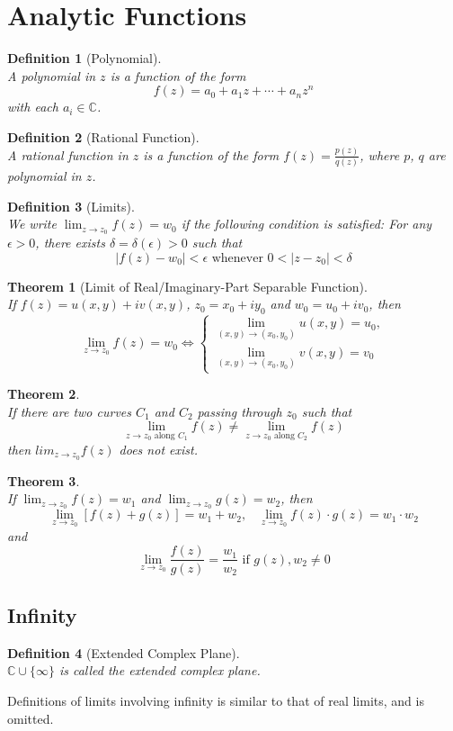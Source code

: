 \documentclass[12pt]{article}
\newtheorem{definition}{Definition}[section]
\newtheorem{theorem}{Theorem}[section]
\theoremstyle{definition}
\begin{document}
\section{Analytic Functions}
\begin{definition}[Polynomial]
\hfill\\\normalfont A polynomial in $z$ is a function of the form
\[
f(z)=a_0 + a_1z+ \cdots + a_nz^n
\]
with each $a_i \in \mathbb{C}$.
\end{definition}
\begin{definition}[Rational Function]
\hfill\\\normalfont A rational function in $z$ is a function of the form $f(z)=\frac{p(z)}{q(z)}$, where $p$, $q$ are polynomial in $z$.
\end{definition}
\begin{definition}[Limits]
\hfill\\\normalfont We write $\lim_{z\to z_0}f(z)=w_0$ if the following condition is satisfied: For any $\epsilon > 0$, there exists $\delta = \delta(\epsilon)>0$ such that 
\[
|f(z)-w_0|<\epsilon \text{ whenever }0<|z-z_0|<\delta
\]
\end{definition}
\begin{theorem}[Limit of Real/Imaginary-Part Separable Function]
\hfill\\\normalfont If $f(z)=u(x,y) + iv(x,y)$, $z_0 = x_0 + iy_0$ and $w_0 = u_0 + iv_0$, then
\[
\lim_{z\to z_0}f(z) = w_0 \Leftrightarrow \begin{cases}\lim_{(x,y)\to(x_0, y_0)}u(x,y) = u_0, \\
\lim_{(x,y)\to(x_0, y_0)}v(x,y) = v_0\end{cases}
\]
\end{theorem}
\begin{theorem}
\hfill\\\normalfont If there are two curves $C_1$ and $C_2$ passing through $z_0$ such that
\[
\lim_{z\to z_0\text{ along }C_1}f(z)\neq \lim_{z\to z_0\text{ along }C_2}f(z)
\]
then $lim_{z\to z_0}f(z)$ does not exist.
\end{theorem}
\begin{theorem}\hfill\\\normalfont If $\lim_{z\to z_0}f(z)=w_1$ and $\lim_{z\to z_0}g(z)=w_2$, then
\[
\lim_{z\to z_0}[f(z)+g(z)]=w_1 + w_2, \;\;\;\lim_{z\to z_0}f(z)\cdot g(z) = w_1\cdot w_2
\]
and
\[
\lim_{z\to z_0}\frac{f(z)}{g(z)}=\frac{w_1}{w_2}\text{ if }g(z), w_2\neq 0
\]
\end{theorem}
\subsection{Infinity}
\begin{definition}[Extended Complex Plane]
\hfill\\\normalfont $\mathbb{C}\cup\{\infty\}$ is called the extended complex plane.
\end{definition}
Definitions of limits involving infinity is similar to that of real limits, and is omitted.
\end{document}
